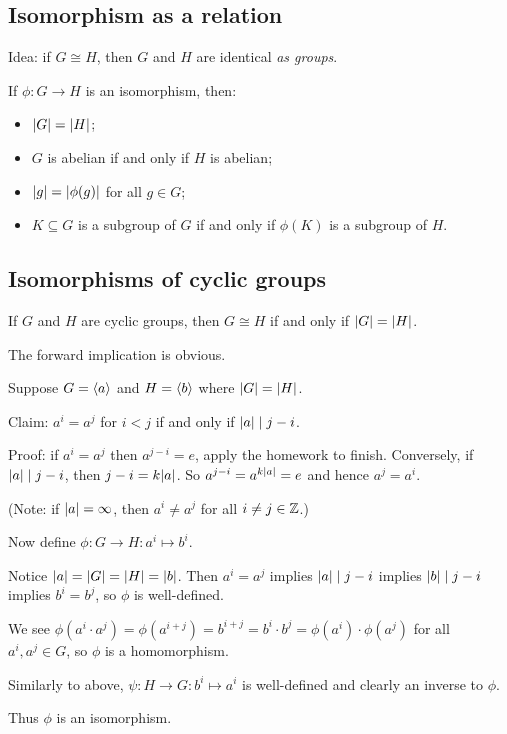 \documentclass[12pt,letterpaper]{report}
\begin{document}
\pagebreak
\subsection{Isomorphism as a relation}

Idea: if $G \cong H$, then $G$ and $H$ are identical \emph{as groups}.

If $\phi \colon G \to H$ is an isomorphism, then:
\begin{itemize}
  \item $\lvert G\rvert = \lvert H\rvert$;
  \item $G$ is abelian if and only if $H$ is abelian;
  \item $\lvert g\rvert = \lvert\phi(g)\rvert$ for all $g \in G$;
  \item $K \subseteq G$ is a subgroup of $G$ if and only if $\phi(K)$ is a subgroup of $H$.
\end{itemize}

\pagebreak
\subsection{Isomorphisms of cyclic groups}

\begin{prop}{}{}
  If $G$ and $H$ are cyclic groups, then $G \cong H$ if and only if $\lvert G\rvert = \lvert H\rvert$.
\end{prop}

\begin{thmproof}
  The forward implication is obvious.

  Suppose $G = \langle a\rangle$ and $H = \langle b\rangle$ where $\lvert G\rvert = \lvert H\rvert$.

  Claim: $a^i = a^j$ for $i < j$ if and only if $\lvert a\rvert \mid j - i$.

  Proof: if $a^i = a^j$ then $a^{j - i} = e$, apply the homework to finish.
  Conversely, if $\lvert a\rvert \mid j - i$, then $j - i = k\lvert a\rvert$.
  So $a^{j - i} = a^{k\lvert a\rvert} = e$ and hence $a^j = a^i$.

  (Note: if $\lvert a\rvert = \infty$, then $a^i \neq a^j$ for all $i \neq j \in \mathbb{Z}$.)

  Now define $\phi \colon G \to H : a^i \mapsto b^i$.

  Notice $\lvert a\rvert = \lvert G\rvert = \lvert H\rvert = \lvert b\rvert$.
  Then $a^i = a^j$ implies $\lvert a\rvert \mid j - i$ implies $\lvert b\rvert \mid j - i$ implies $b^i = b^j$, so
  $\phi$ is well-defined.

  We see $\phi(a^i \cdot a^j) = \phi(a^{i + j}) = b^{i + j} = b^i \cdot b^j
    = \phi(a^i) \cdot \phi(a^j)$ for all $a^i, a^j \in G$, so $\phi$ is a homomorphism.

  Similarly to above, $\psi \colon H \to G : b^i \mapsto a^i$ is well-defined and clearly an
  inverse to $\phi$.

  Thus $\phi$ is an isomorphism.
\end{thmproof}
\end{document}

